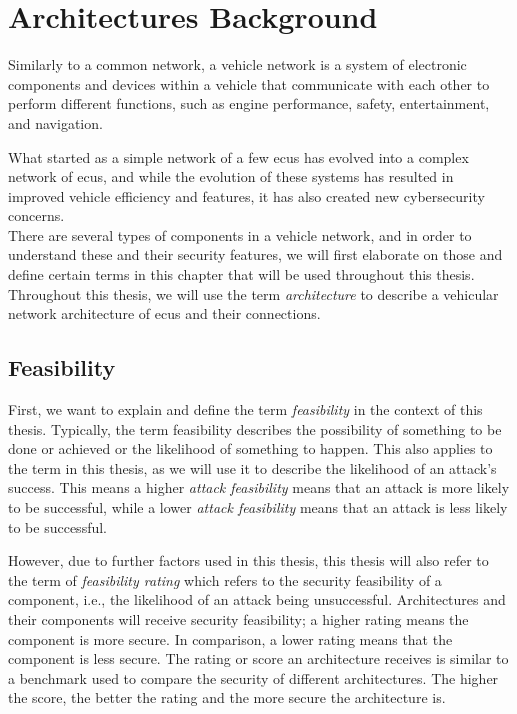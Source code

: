 \chapter{Architectures Background}
\label{chp:arch}

Similarly to a common network, a vehicle network is a system of electronic components and devices within a vehicle 
that communicate with each other to perform different functions, such as engine performance, safety, entertainment, and navigation. 

What started as a simple network of a few \acrshort{ecu}s has evolved into a complex network of \acrshort{ecu}s,
and while the evolution of these systems has resulted in improved vehicle efficiency and features, 
it has also created new cybersecurity concerns.
\\

There are several types of components in a vehicle network, and in order to understand these and their security features,
we will first elaborate on those and define certain terms in this chapter that will be used throughout this thesis.
Throughout this thesis, we will use the term \textit{architecture} to describe a vehicular network architecture of \acrshort{ecu}s and their connections.

\section{Feasibility}
\label{def:feasibility}

First, we want to explain and define the term \textit{feasibility} in the context of this thesis.
Typically, the term feasibility describes the possibility of something to be done or achieved or the likelihood of something to happen.
This also applies to the term in this thesis, as we will use it to describe the likelihood of an attack's success.
This means a higher \textit{attack feasibility} means that an attack is more likely to be successful, while a lower \textit{attack feasibility} means that an attack is less likely to be successful.

However, due to further factors used in this thesis, this thesis will also refer to the term of \textit{feasibility rating}
which refers to the security feasibility of a component, i.e., the likelihood of an attack being unsuccessful.
Architectures and their components will receive security feasibility; a higher rating means the component is more secure. 
In comparison, a lower rating means that the component is less secure.
The rating or score an architecture receives is similar to a benchmark used to compare the security of different architectures.
The higher the score, the better the rating and the more secure the architecture is.

